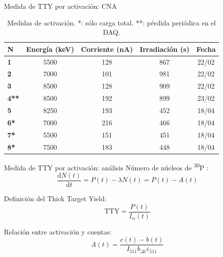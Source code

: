 \documentclass[11pt]{beamer}
\newcommand{\dif}{\text{d}}
\newcommand{\ddt}[1]{\frac{\dif #1}{\dif t}}
\newcommand{\Piso}{\textsuperscript{30}P }
\begin{document}
\begin{frame}{Medida de TTY por activación: CNA}
	\begin{table}[H]
		\centering
		\begin{tabular}[c]{>{\bfseries}l||c|c|c|c}
			N & Energía (\unit{\keV}) & Corriente (\unit{\nano\A}) & Irradiación (\unit{\s}) & Fecha \\ \hline
			1       &\num{5500}&\num{128}&\num{867}&22/02\\ \hline
			2       &\num{7000}&\num{101}&\num{981}&22/02\\ \hline
			3       &\num{8500}&\num{128}&\num{909}&22/02\\ \hline
			4**     &\num{8500}&\num{192}&\num{899}&23/02\\ \hline
			5       &\num{8250}&\num{193}&\num{452}&18/04\\ \hline
			6*      &\num{7000}&\num{216}&\num{466}&18/04\\ \hline
			7*      &\num{5500}&\num{151}&\num{451}&18/04\\ \hline
			8*      &\num{7500}&\num{183}&\num{448}&18/04\\ \hline
		\end{tabular}
		\caption{Medidas de activación. *: sólo carga total. **: pérdida periódica en el DAQ.}
		\label{activation_measurements_table}
	\end{table}
\end{frame}

\begin{frame}{Medida de TTY por activación: análisis}
	Número de núcleos de \Piso:
	\begin{equation}
		\ddt{N(t)} = P(t) -\lambda N(t) = P(t) - A(t)
		\label{general_diffeq}
	\end{equation}

	Definición del Thick Target Yield:
	\begin{equation}
		\text{TTY} = \frac{P(t)}{I_\alpha(t)}
	\end{equation}

	Relación entre activación y cuentas:
	\begin{equation}
		A(t) = \frac{c(t) - b(t)}{I_{511} b_{\Delta t} \varepsilon_{511}}
	\end{equation}
\end{frame}
\end{document}
